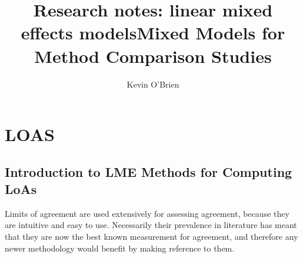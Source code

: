 \documentclass[12pt, a4paper]{report}
\title{Research notes: linear mixed effects models}
\author{ } \date{ }
\theoremstyle{plain}
\theoremstyle{definition}
\theoremstyle{remark}
\begin{document}
\author{Kevin O'Brien}
\title{Mixed Models for Method Comparison Studies}
\tableofcontents

\chapter{LOAS}



\section{Introduction to LME Methods for Computing LoAs}


Limits of agreement are used extensively for assessing agreement, because they are intuitive and easy to use.
Necessarily their prevalence in literature has meant that they are now the best known measurement for agreement, and therefore any newer methodology would benefit by making reference to them.
\end{document}
